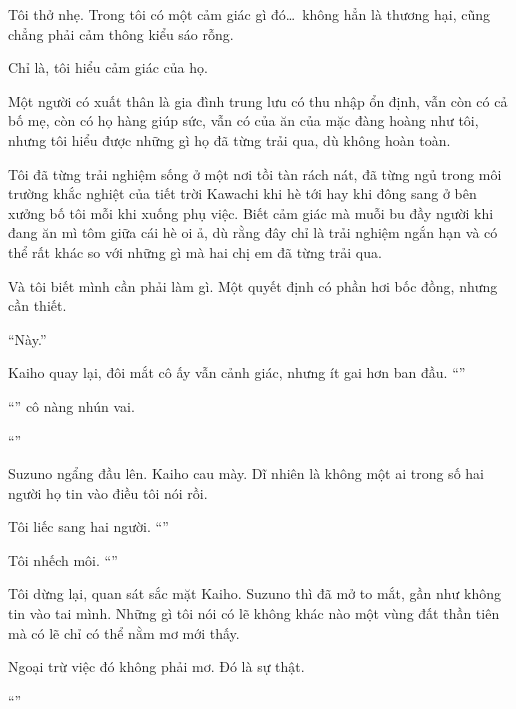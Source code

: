 \documentclass[../main.tex]{subfiles}
\begin{document}
Tôi thở nhẹ. Trong tôi có một cảm giác gì đó\dots\ không hẳn là thương hại, cũng chẳng phải cảm thông kiểu sáo rỗng.

Chỉ là, tôi hiểu cảm giác của họ.

Một người có xuất thân là gia đình trung lưu có thu nhập ổn định, vẫn còn có cả bố mẹ, còn có họ hàng giúp sức, vẫn có của ăn của mặc đàng hoàng như tôi, nhưng tôi hiểu được những gì họ đã từng trải qua, dù không hoàn toàn.

Tôi đã từng trải nghiệm sống ở một nơi tồi tàn rách nát, đã từng ngủ trong môi trường khắc nghiệt của tiết trời Kawachi khi hè tới hay khi đông sang ở bên xưởng bố tôi mỗi khi xuống phụ việc. Biết cảm giác mà muỗi bu đầy người khi đang ăn mì tôm giữa cái hè oi ả, dù rằng đây chỉ là trải nghiệm ngắn hạn và có thể rất khác so với những gì mà hai chị em đã từng trải qua.

Và tôi biết mình cần phải làm gì. Một quyết định có phần hơi bốc đồng, nhưng cần thiết.

``Này.''

Kaiho quay lại, đôi mắt cô ấy vẫn cảnh giác, nhưng ít gai hơn ban đầu. ``''

``'' cô nàng nhún vai.

``''

Suzuno ngẩng đầu lên. Kaiho cau mày. Dĩ nhiên là không một ai trong số hai người họ tin vào điều tôi nói rồi.

Tôi liếc sang hai người. ``''

Tôi nhếch môi. ``''

Tôi dừng lại, quan sát sắc mặt Kaiho. Suzuno thì đã mở to mắt, gần như không tin vào tai mình. Những gì tôi nói có lẽ không khác nào một vùng đất thần tiên mà có lẽ chỉ có thể nằm mơ mới thấy.

Ngoại trừ việc đó không phải mơ. Đó là sự thật.

``''
\end{document}
